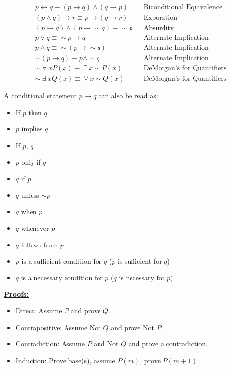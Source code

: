 \documentclass[11pt]{article}
\begin{document}
\begin{minipage}[c]{0.4\textwidth}
\begin{align*}
    &p \leftrightarrow q \equiv (p \rightarrow q) \wedge (q \rightarrow p) &&\text{Biconditional Equivalence} \\
    &(p \wedge q) \rightarrow r \equiv p \rightarrow (q \rightarrow r) &&\text{Exporation} \\
    &(p \rightarrow q) \wedge (p \rightarrow \sim q) \equiv \sim p &&\text{Absurdity} \\
    &p \vee q \equiv \sim p \rightarrow q &&\text{Alternate Implication} \\
    &p \wedge q \equiv \sim(p \rightarrow \sim q) &&\text{Alternate Implication} \\
    &\sim(p \rightarrow q) \equiv p \wedge \sim q &&\text{Alternate Implication} \\
    &\sim \ \forall \ x P(x) \equiv \ \exists \ x \sim P(x) &&\text{DeMorgan's for Quantifiers} \\
    &\sim \ \exists \ x Q(x) \equiv \ \forall \ x \sim Q(x) &&\text{DeMorgan's for Quantifiers} 
\end{align*}
\end{minipage}
{\color{lightgray}\vline}
\begin{minipage}[t][3.1in][b]{0.4 \textwidth}
A conditional statement $p \rightarrow q$ can also be read as:
\begin{itemize}
    \item If $p$ then $q$ 
    \item $p$ implies $q$
    \item If $p$, $q$
    \item $p$ only if $q$
    \item $q$ if $p$
    \item $q$ unless $\sim p$
    \item $q$ when $p$
    \item $q$ whenever $p$
    \item $q$ follows from $p$
    \item $p$ is a sufficient condition for $q$ ($p$ is sufficient for $q$)
    \item $q$ is a necessary condition for $p$ ($q$ is necessary for $p$)
\end{itemize}

\bigskip

\underline{\bf Proofs:}
\begin{itemize}
    \item Direct: Assume $P$ and prove $Q$.
    \item Contrapositive: Assume Not $Q$ and prove Not $P$.
    \item Contradiction: Assume $P$ and Not $Q$ and prove a contradiction.
    \item Induction: Prove base(s), assume $P(m)$, prove $P(m+1)$.
\end{itemize}
\end{minipage}
\end{document}
